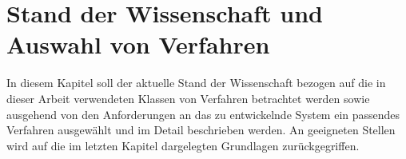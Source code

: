 \chapter{Stand der Wissenschaft und Auswahl von Verfahren}

In diesem Kapitel soll der aktuelle Stand der Wissenschaft bezogen auf die in dieser Arbeit verwendeten Klassen von Verfahren betrachtet werden sowie ausgehend von den Anforderungen an das zu entwickelnde System ein passendes Verfahren ausgewählt und im Detail beschrieben werden. An geeigneten Stellen wird auf die im letzten Kapitel dargelegten Grundlagen zurückgegriffen.


\label{cha_state}







